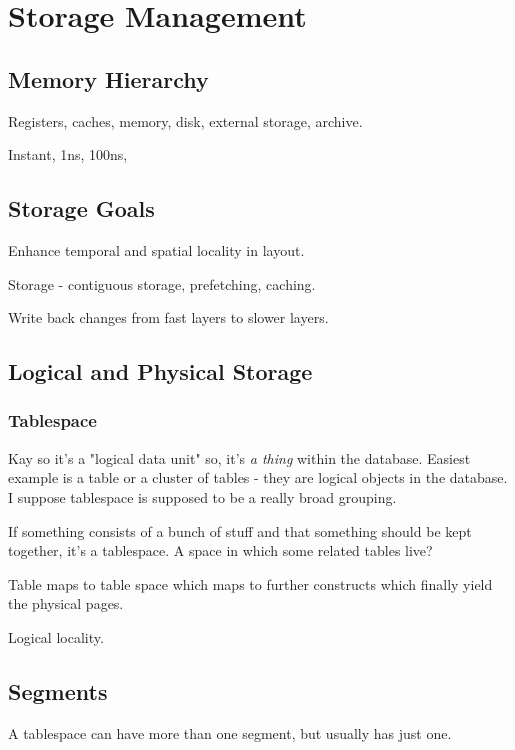\documentclass{article}
\begin{document}
	
\newpage	
\section{Storage Management}

	\subsection{Memory Hierarchy}
	
		Registers, caches, memory, disk, external storage, archive.
		
		Instant, 1ns, 100ns, 
		
	\subsection{Storage Goals}
	
		Enhance temporal and spatial locality in layout.
		
		Storage - contiguous storage, prefetching, caching.
		
		Write back changes from fast layers to slower layers.
		
	\subsection{Logical and Physical Storage}
	
		\subsubsection{Tablespace}
		
			Kay so it's a "logical data unit" so, it's \textit{a thing} within the database. Easiest example is a table or a cluster of tables - they are logical objects in the database. I suppose tablespace is supposed to be a really broad grouping.
			
			If something consists of a bunch of stuff and that something should be kept together, it's a tablespace. A space in which some related tables live?
			
			Table maps to table space which maps to further constructs which finally yield the physical pages.
			
			Logical locality.
			
		\subsection{Segments}
		
			A tablespace can have more than one segment, but usually has just one.
			
\end{document}
